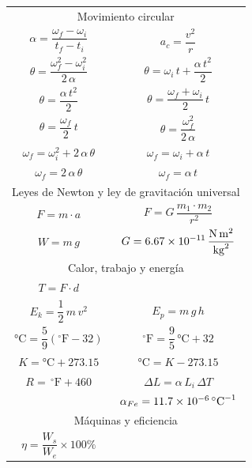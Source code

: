 \documentclass[12pt, letter]{exam}
\begin{document}
\begin{table}[H]
    \centering
    \setlength{\tabcolsep}{40pt}
    \renewcommand{\arraystretch}{2.5}
    \begin{tabular}{c  c}
        \multicolumn{2}{c}{Movimiento circular} \\
            $\alpha = \dfrac{\omega_{f} - \omega_{i}}{t_{f} - t_{i}}$ & $a_{c} = \dfrac{v^{2}}{r}$ \\
            $\theta = \dfrac{\omega_{f}^{2} - \omega_{i}^{2}}{2 \, \alpha}$ & $\theta = \omega_{i} \, t + \dfrac{\alpha \, t^{2}}{2}$ \\
            $\theta = \dfrac{\alpha \, t^{2}}{2}$ & $\theta = \dfrac{\omega_{f} + \omega_{i}}{2} \, t$ \\
            $\theta = \dfrac{\omega_{f}}{2} \, t$ & $\theta = \dfrac{\omega_{f}^{2}}{2 \, \alpha}$ \\
            $\omega_{f} = \omega_{i}^{2} + 2 \, \alpha \, \theta$ & $\omega_{f} = \omega_{i} + \alpha \, t$ \\
            $\omega_{f} = 2 \, \alpha \, \theta$ & $\omega_{f} = \alpha \, t$ \\ \hline
        \multicolumn{2}{c}{Leyes de Newton y ley de gravitación universal} \\
            $F = m \cdot a$ & $F = G \, \dfrac{m_{1} \cdot m_{2}}{r^{2}}$ \\
            $W = m \, g$ & $G = \displaystyle \SI[per-mode=fraction]{6.67d-11}{\newton\square\meter\per\square\kilo\gram}$ \\ \hline
        \multicolumn{2}{c}{Calor, trabajo y energía} \\
            $T = F \cdot d$ &  \\
            $E_{k} = \dfrac{1}{2} \, m \, v^{2}$ & $E_{p} = m \, g \, h$ \\
            $\unit{\degreeCelsius} = \dfrac{5}{9} \left( ^{\circ}\text{F} - 32 \right)$ & $^{\circ}\text{F} = \dfrac{9}{5} \, \unit{\degreeCelsius} + 32$ \\
            $K = \unit{\degreeCelsius} + 273.15$ & $\unit{\degreeCelsius} = K - 273.15$ \\
            $R = \, ^{\circ}\text{F} + 460$ & $\Delta L = \alpha \, L_{i} \, \Delta T$ \\
             & $\alpha_{Fe} = \SI{11.7d-6}{\degreeCelsius}^{-1}$ \\ \hline
        \multicolumn{2}{c}{Máquinas y eficiencia} \\
            $\eta = \dfrac{W_{s}}{W_{e}} \times 100 \%$ & \\
\end{tabular}
\end{table}
\end{document}
